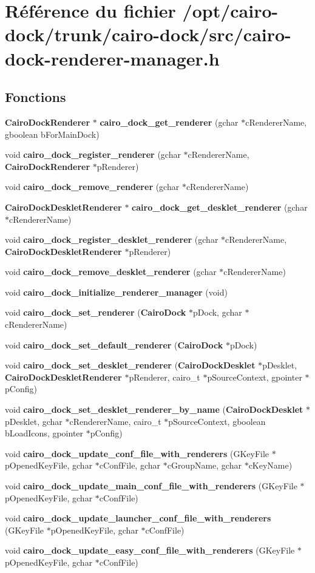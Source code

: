 \section{Référence du fichier /opt/cairo-dock/trunk/cairo-dock/src/cairo-dock-renderer-manager.h}
\label{cairo-dock-renderer-manager_8h}
\subsection*{Fonctions}
\begin{CompactItemize}
\item 
{\bf CairoDockRenderer} $\ast$ {\bf cairo\_\-dock\_\-get\_\-renderer} (gchar $\ast$cRendererName, gboolean bForMainDock)
\item 
void {\bf cairo\_\-dock\_\-register\_\-renderer} (gchar $\ast$cRendererName, {\bf CairoDockRenderer} $\ast$pRenderer)
\item 
void {\bf cairo\_\-dock\_\-remove\_\-renderer} (gchar $\ast$cRendererName)
\item 
{\bf CairoDockDeskletRenderer} $\ast$ {\bf cairo\_\-dock\_\-get\_\-desklet\_\-renderer} (gchar $\ast$cRendererName)
\item 
void {\bf cairo\_\-dock\_\-register\_\-desklet\_\-renderer} (gchar $\ast$cRendererName, {\bf CairoDockDeskletRenderer} $\ast$pRenderer)
\item 
void {\bf cairo\_\-dock\_\-remove\_\-desklet\_\-renderer} (gchar $\ast$cRendererName)
\item 
void {\bf cairo\_\-dock\_\-initialize\_\-renderer\_\-manager} (void)
\item 
void {\bf cairo\_\-dock\_\-set\_\-renderer} ({\bf CairoDock} $\ast$pDock, gchar $\ast$cRendererName)
\item 
void {\bf cairo\_\-dock\_\-set\_\-default\_\-renderer} ({\bf CairoDock} $\ast$pDock)
\item 
void {\bf cairo\_\-dock\_\-set\_\-desklet\_\-renderer} ({\bf CairoDockDesklet} $\ast$pDesklet, {\bf CairoDockDeskletRenderer} $\ast$pRenderer, cairo\_\-t $\ast$pSourceContext, gpointer $\ast$pConfig)
\item 
void {\bf cairo\_\-dock\_\-set\_\-desklet\_\-renderer\_\-by\_\-name} ({\bf CairoDockDesklet} $\ast$pDesklet, gchar $\ast$cRendererName, cairo\_\-t $\ast$pSourceContext, gboolean bLoadIcons, gpointer $\ast$pConfig)
\item 
void {\bf cairo\_\-dock\_\-update\_\-conf\_\-file\_\-with\_\-renderers} (GKeyFile $\ast$pOpenedKeyFile, gchar $\ast$cConfFile, gchar $\ast$cGroupName, gchar $\ast$cKeyName)
\item 
void {\bf cairo\_\-dock\_\-update\_\-main\_\-conf\_\-file\_\-with\_\-renderers} (GKeyFile $\ast$pOpenedKeyFile, gchar $\ast$cConfFile)
\item 
void {\bf cairo\_\-dock\_\-update\_\-launcher\_\-conf\_\-file\_\-with\_\-renderers} (GKeyFile $\ast$pOpenedKeyFile, gchar $\ast$cConfFile)
\item 
void {\bf cairo\_\-dock\_\-update\_\-easy\_\-conf\_\-file\_\-with\_\-renderers} (GKeyFile $\ast$pOpenedKeyFile, gchar $\ast$cConfFile)
\end{CompactItemize}


